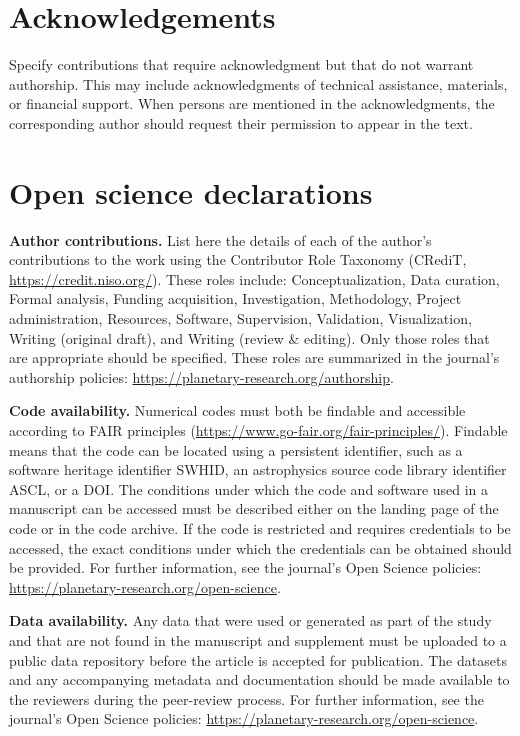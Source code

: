 \documentclass[article,preview]{planetary}
\begin{document}
\section*{Acknowledgements}
Specify contributions that require acknowledgment but that do not warrant authorship. This may include acknowledgments of technical assistance, materials, or financial support. When persons are mentioned in the acknowledgments, the corresponding author should request their permission to appear in the text.

\section*{Open science declarations}

\noindent\textbf{Author contributions.} List here the details of each of the author's contributions to the work using the Contributor Role Taxonomy (CRediT, \href{https://credit.niso.org/}{https://credit.niso.org/}). These roles include: Conceptualization, Data curation, Formal analysis, Funding acquisition, Investigation, Methodology, Project administration, Resources, Software, Supervision, Validation, Visualization, Writing (original draft), and Writing (review \& editing). Only those roles that are appropriate should be specified. These roles are summarized in the journal's authorship policies: \href{https://planetary-research.org/authorship}{https://planetary-research.org/authorship}.

\noindent\textbf{Code availability.} Numerical codes must both be findable and accessible according to FAIR principles (\href{https://www.go-fair.org/fair-principles/}{https://www.go-fair.org/fair-principles/}). Findable means that the code can be located using a persistent identifier, such as a software heritage identifier SWHID, an astrophysics source code library identifier ASCL, or a DOI. The conditions under which the code and software used in a manuscript can be accessed must be described either on the landing page of the code or in the code archive. If the code is restricted and requires credentials to be accessed, the exact conditions under which the credentials can be obtained should be provided. For further information, see the journal's Open Science policies: \href{https://planetary-research.org/open-science}{https://planetary-research.org/open-science}.

\noindent\textbf{Data availability.} Any data that were used or generated as part of the study and that are not found in the manuscript and supplement must be uploaded to a public data repository before the article is accepted for publication. The datasets and any accompanying metadata and documentation should be made available to the reviewers during the peer-review process. For further information, see the journal's Open Science policies: \href{https://planetary-research.org/open-science}{https://planetary-research.org/open-science}.
\end{document}
